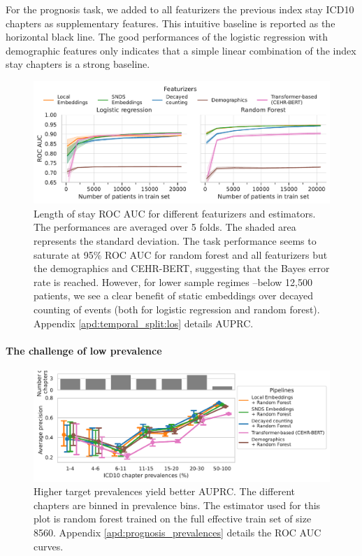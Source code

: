 \documentclass[french,12pt,twoside,a4paper]{book}
\begin{document}
For the prognosis task, we added to all featurizers the previous index stay
ICD10 chapters as supplementary features. This intuitive baseline is reported as
the horizontal black line. The good performances of the logistic regression with
demographic features only indicates that a simple linear combination of the
index stay chapters is a strong baseline.

\begin{figure}[!h]
  \centering
  \includegraphics[width=0.9\linewidth]{img/chapter_3/los/roc_auc_score_performances.pdf}
  \caption{Length of stay ROC AUC for different featurizers and estimators. The
    performances are averaged over 5 folds. The shaded area represents the
    standard deviation. The task performance seems to saturate at 95\% ROC AUC
    for random forest and all featurizers but the demographics and CEHR-BERT,
    suggesting that the Bayes error rate is reached. However, for lower sample
    regimes --below 12,500 patients, we see a clear benefit of static
    embeddings over decayed counting of events (both for logistic regression and
    random forest). Appendix \ref{apd:temporal_split:los} details AUPRC.}%
  \label{fig:los_roc_auc}
\end{figure}


\paragraph{The challenge of low prevalence}

\begin{figure}[!h]
  \centering
  \includegraphics[width=1\linewidth]{img/chapter_3/prognosis/prevalence_results__est_random_forests_boxplot_average_precision_score_xlog.pdf}
  \caption{Higher target prevalences yield better AUPRC. The
    different chapters are binned in prevalence bins. The estimator used for
    this plot is random forest trained on the full effective train set of size
    8560. Appendix \ref{apd:prognosis_prevalences} details the ROC AUC curves.}%
  \label{fig:prognosis_prevalences_auprc}
\end{figure}
\end{document}

